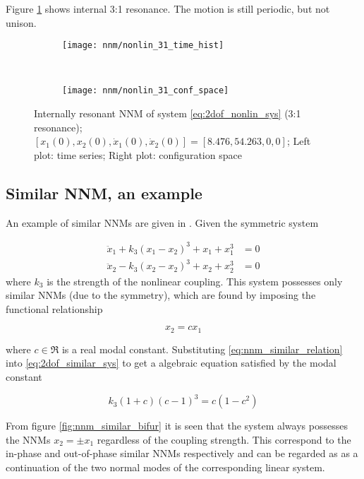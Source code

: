 Figure \ref{fig:nonlin_3:1_int_resonance} shows internal 3:1 resonance. The
motion is still periodic, but not unison.

\begin{figure}[!ht]
  \centering
  \begin{subfigure}[b]{0.45\textwidth}
    \texttt{[image: nnm/nonlin\_31\_time\_hist]}
  \end{subfigure}
  ~
  \begin{subfigure}[b]{0.45\textwidth}
    \texttt{[image: nnm/nonlin\_31\_conf\_space]}
  \end{subfigure}
  \caption{Internally resonant NNM of system \eqref{eq:2dof_nonlin_sys} (3:1
    resonance);
    $[x_1(0), x_2(0), \dot x_1(0), \dot x_2(0)] = [8.476, 54.263, 0, 0]$;
    Left plot: time series;
    Right plot: configuration space}
  \label{fig:nonlin_3:1_int_resonance}
\end{figure}




\subsection{Similar NNM, an example}
\label{sec:similar-nnm-an}


An example of similar NNMs are given in \autocite{vakakis1992a}.
Given the symmetric system

\begin{align}
    \ddot x_1 + k_3(x_1 - x_2)^3 + x_1 + x_1^3&= 0 \nonumber \\
    \ddot x_2 - k_3(x_2 - x_2)^3 + x_2 + x_2^3&= 0 \label{eq:2dof_similar_sys}
\end{align}
where $k_3$ is the strength of the nonlinear coupling.
This system possesses only similar NNMs (due to the symmetry), which are found
by imposing the functional relationship

\begin{equation}
  \label{eq:nnm_similar_relation}
  x_2 = c x_1
\end{equation}

where $c \in \Re$ is a real modal constant. Substituting
\eqref{eq:nnm_similar_relation} into \eqref{eq:2dof_similar_sys} to get a
algebraic equation satisfied by the modal constant

\begin{equation}
  \label{eq:nmm_similar_modal}
  k_3(1+c)(c-1)^3 = c(1-c^2)
\end{equation}

From figure \ref{fig:nnm_similar_bifur} it is seen that the system always
possesses the NNMs $x_2 = \pm x_1$ regardless of the coupling strength. This
correspond to the in-phase and out-of-phase similar NNMs respectively and can
be regarded as as a continuation of the two normal modes of the corresponding
linear system.


